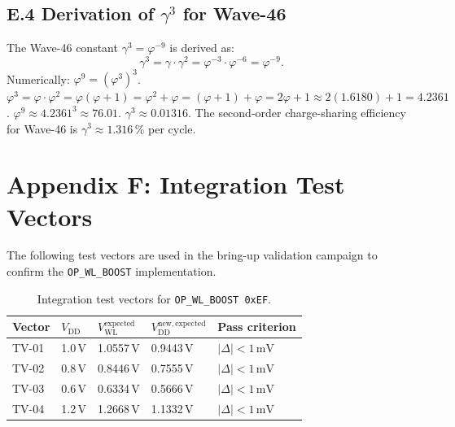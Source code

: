 \subsection*{E.4 Derivation of $\gamma^{3}$ for Wave-46}

The Wave-46 constant $\gamma^{3} = \varphi^{-9}$ is derived as:
\[
  \gamma^{3} = \gamma \cdot \gamma^{2} = \varphi^{-3} \cdot \varphi^{-6} = \varphi^{-9}.
\]
Numerically: $\varphi^{9} = (\varphi^{3})^{3}$.
$\varphi^{3} = \varphi \cdot \varphi^{2} = \varphi(\varphi+1)
= \varphi^{2}+\varphi = (\varphi+1)+\varphi = 2\varphi+1
\approx 2(1.6180)+1 = 4.2361$.
$\varphi^{9} \approx 4.2361^{3} \approx 76.01$.
$\gamma^{3} \approx 0.01316$.
The second-order charge-sharing efficiency for Wave-46 is
$\gamma^{3} \approx 1.316\,\%$ per cycle.

\section*{Appendix F: Integration Test Vectors}
\label{sec:wlboost-appendix-testvec}

The following test vectors are used in the bring-up validation
campaign to confirm the \texttt{OP\_WL\_BOOST} implementation.

\begin{table}[htbp]
  \centering
  \caption{Integration test vectors for \texttt{OP\_WL\_BOOST 0xEF}.}
  \label{tab:test-vectors}
  \begin{tabular}{lllll}
    \hline
    \textbf{Vector} & $V_{\mathrm{DD}}$ & $V_{\mathrm{WL}}^{\mathrm{expected}}$
      & $V_{\mathrm{DD}}^{\mathrm{new,expected}}$
      & \textbf{Pass criterion} \\
    \hline
    TV-01 & 1.0\,V & 1.0557\,V & 0.9443\,V & $|\Delta| < 1\,\text{mV}$ \\
    TV-02 & 0.8\,V & 0.8446\,V & 0.7555\,V & $|\Delta| < 1\,\text{mV}$ \\
    TV-03 & 0.6\,V & 0.6334\,V & 0.5666\,V & $|\Delta| < 1\,\text{mV}$ \\
    TV-04 & 1.2\,V & 1.2668\,V & 1.1332\,V & $|\Delta| < 1\,\text{mV}$ \\
    \hline
  \end{tabular}
\end{table}


